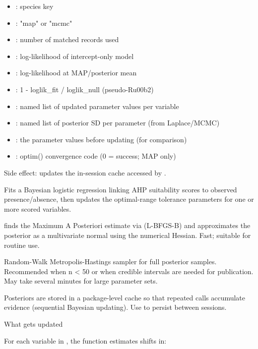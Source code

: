 \documentclass[a4paper]{book}
\begin{document}
\begin{Arguments}
\begin{itemize}
\item{} : species key
\item{} : "map" or "mcmc"
\item{} : number of matched records used
\item{} : log-likelihood of intercept-only model
\item{} : log-likelihood at MAP/posterior mean
\item{} : 1 - loglik\_fit / loglik\_null (pseudo-R\bsl{}u00b2)
\item{} : named list of updated parameter values per variable
\item{} : named list of posterior SD per parameter (from Laplace/MCMC)
\item{} : the parameter values before updating (for comparison)
\item{} : optim() convergence code (0 = success; MAP only)

\end{itemize}


Side effect: updates the in-session cache accessed by .


Fits a Bayesian logistic regression linking AHP suitability scores to
observed presence/absence, then updates the optimal-range tolerance
parameters for one or more scored variables.

 finds the Maximum A Posteriori estimate
via  (L-BFGS-B) and approximates the posterior as a multivariate
normal using the numerical Hessian. Fast; suitable for routine use.

 Random-Walk Metropolis-Hastings sampler for full posterior
samples. Recommended when n < 50 or when credible intervals are needed for
publication. May take several minutes for large parameter sets.

Posteriors are stored in a package-level cache so that repeated calls
accumulate evidence (sequential Bayesian updating). Use
 to persist between sessions.

What gets updated

For each variable in , the function estimates shifts in:
\begin{itemize}


\end{itemize}
\end{Arguments}
\end{document}
